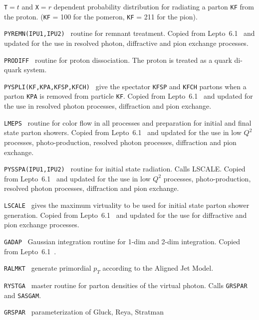 \documentclass[10pt]{article} \usepackage{dina4}
\def\LEPTO{{\sc Lepto}}
\newcommand{\deflab}[1]{#1\hfil}%
\newenvironment{defl}[1]%
  {\begin{list}{}{\settowidth{\labelwidth}{#1}%
  \setlength{\leftmargin}{\labelwidth}%
  \addtolength{\leftmargin}{\labelsep}%
  \setlength{\itemsep}{0pt plus 1pt}
  \setlength{\parsep}{0pt plus 1pt}
  \setlength{\topsep}{0pt plus 1pt}
  \setlength{\partopsep}{0pt plus 1pt}
  \setlength{\parskip}{2mm plus 1mm minus 1mm}
  \let\makelabel\deflab}}%
  {\end{list}}
\begin{document}
\begin{defl}{123456789012345}
            \verb+T+$=t$ 
            and \verb+X+$=r$ dependent probability distribution for
            radiating a parton \verb+KF+ from the proton.
            (\verb+KF+ = 100 for the pomeron, \verb+KF+ = 211 for the pion).
\item[{\tt PYREMN(IPU1,IPU2) }]  routine for remnant treatment.
            Copied from \LEPTO\ 6.1~\cite{MEPS} and updated for
            the use in resolved photon, diffractive and 
            pion exchange processes. 
\item[{\tt PRODIFF }]  routine for proton dissociation.
            The proton is treated as a quark di-quark system.
\item[{\tt PYSPLI(KF,KPA,KFSP,KFCH) }]  
            give the spectator \verb+KFSP+ and \verb+KFCH+
            partons when a parton
            \verb+KPA+ is removed from particle \verb+KF+.
            Copied from \LEPTO\ 6.1~\cite{MEPS} and updated for
            the use in resolved photon processes,
            diffraction and pion exchange. 
\item[{\tt LMEPS }]  routine for color flow in all
            processes and preparation for initial and final state
            parton showers.
            Copied from \LEPTO\ 6.1~\cite{MEPS} and updated for
            the use in low $Q^2$ processes, photo-production,
            resolved photon processes, diffraction and pion exchange. 
\item[{\tt PYSSPA(IPU1,IPU2) }]  routine for initial state radiation.
            Calls LSCALE.
            Copied from \LEPTO\ 6.1~\cite{MEPS} and updated for
            the use in low $Q^2$ processes, photo-production,
            resolved photon processes, diffraction and pion exchange. 
\item[{\tt LSCALE }]  gives the maximum virtuality
            to be used for initial state parton shower generation.
            Copied from \LEPTO\ 6.1~\cite{MEPS} and updated for
            the use for diffractive and pion exchange processes. 
\item[{\tt GADAP }]  Gaussian integration routine for 1-dim and 
            2-dim integration.
            Copied from \LEPTO\ 6.1~\cite{MEPS}.
\item[{\tt RALMKT }]  generate primordial $p_T$ according to the
                       Aligned Jet Model.
\item[{\tt RYSTGA }]  master routine for parton densities of the virtual 
                       photon. Calls \verb+GRSPAR+ and \verb+SASGAM+.
\item[{\tt GRSPAR }]  parameterization of Gluck, Reya, Stratman 

\end{defl}
\end{document}
